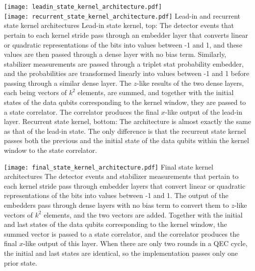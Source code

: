 \begin{figure*}[htb]
\centering
\texttt{[image: leadin\_state\_kernel\_architecture.pdf]}\\
\texttt{[image: recurrent\_state\_kernel\_architecture.pdf]}
\ccaption
{Lead-in and recurrent state kernel architectures}
{
Lead-in state kernel, top: The detector events that pertain to each kernel stride pass through an embedder layer that converts linear or quadratic representations of the bits into values between -1 and 1, and these values are then passed through a dense layer with no bias term. Similarly, stabilizer measurements are passed through a triplet stat probability embedder, and the probabilities are transformed linearly into values between -1 and 1 before passing through a similar dense layer.
The $z$-like results of the two dense layers, each being vectors of $k^2$ elements, are summed, and together with the initial states of the data qubits corresponding to the kernel window, they are passed to a state correlator. The correlator produces the final $x$-like output of the lead-in layer.
Recurrent state kernel, bottom: The architecture is almost exactly the same as that of the lead-in state. The only difference is that the recurrent state kernel passes both the previous and the initial state of the data qubits within the kernel window to the state correlator.
}
\label{fig:RCNN-lirec-arch}
\end{figure*}



\begin{figure*}[htb]
\centering
\texttt{[image: final\_state\_kernel\_architecture.pdf]}
\ccaption
{Final state kernel architectures}
{
The detector events and stabilizer measurements that pertain to each kernel stride pass through embedder layers that convert linear or quadratic representations of the bits into values between -1 and 1.
The output of the embedders pass through dense layers with no bias term to convert them to $z$-like vectors of $k^2$ elements, and the two vectors are added.
Together with the initial and last states of the data qubits corresponding to the kernel window, the summed vector is passed to a state correlator, and the correlator produces the final $x$-like output of this layer.
When there are only two rounds in a QEC cycle, the initial and last states are identical, so the implementation passes only one prior state.
}
\label{fig:RCNN-final-arch}
\end{figure*}


